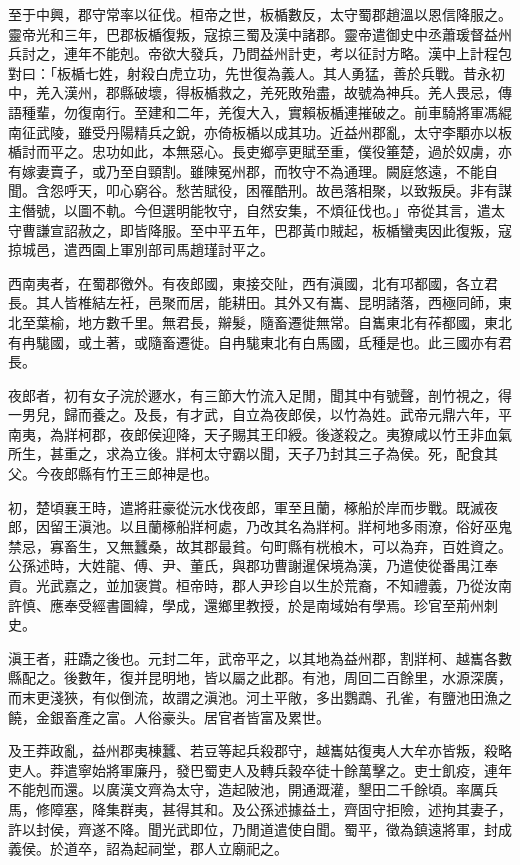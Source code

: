 \begin{pinyinscope}
至于中興，郡守常率以征伐。桓帝之世，板楯數反，太守蜀郡趙溫以恩信降服之。靈帝光和三年，巴郡板楯復叛，寇掠三蜀及漢中諸郡。靈帝遣御史中丞蕭瑗督益州兵討之，連年不能剋。帝欲大發兵，乃問益州計吏，考以征討方略。漢中上計程包對曰：「板楯七姓，射殺白虎立功，先世復為義人。其人勇猛，善於兵戰。昔永初中，羌入漢州，郡縣破壞，得板楯救之，羌死敗殆盡，故號為神兵。羌人畏忌，傳語種輩，勿復南行。至建和二年，羌復大入，實賴板楯連摧破之。前車騎將軍馮緄南征武陵，雖受丹陽精兵之銳，亦倚板楯以成其功。近益州郡亂，太守李顒亦以板楯討而平之。忠功如此，本無惡心。長吏鄉亭更賦至重，僕役箠楚，過於奴虜，亦有嫁妻賣子，或乃至自頸割。雖陳冤州郡，而牧守不為通理。闕庭悠遠，不能自聞。含怨呼天，叩心窮谷。愁苦賦役，困罹酷刑。故邑落相聚，以致叛戾。非有謀主僭號，以圖不軌。今但選明能牧守，自然安集，不煩征伐也。」帝從其言，遣太守曹謙宣詔赦之，即皆降服。至中平五年，巴郡黃巾賊起，板楯蠻夷因此復叛，寇掠城邑，遣西園上軍別部司馬趙瑾討平之。

西南夷者，在蜀郡徼外。有夜郎國，東接交阯，西有滇國，北有邛都國，各立君長。其人皆椎結左衽，邑聚而居，能耕田。其外又有巂、昆明諸落，西極同師，東北至葉榆，地方數千里。無君長，辮髮，隨畜遷徙無常。自巂東北有莋都國，東北有冉駹國，或土著，或隨畜遷徙。自冉駹東北有白馬國，氐種是也。此三國亦有君長。

夜郎者，初有女子浣於遯水，有三節大竹流入足閒，聞其中有號聲，剖竹視之，得一男兒，歸而養之。及長，有才武，自立為夜郎侯，以竹為姓。武帝元鼎六年，平南夷，為牂柯郡，夜郎侯迎降，天子賜其王印綬。後遂殺之。夷獠咸以竹王非血氣所生，甚重之，求為立後。牂柯太守霸以聞，天子乃封其三子為侯。死，配食其父。今夜郎縣有竹王三郎神是也。

初，楚頃襄王時，遣將莊豪從沅水伐夜郎，軍至且蘭，椓船於岸而步戰。既滅夜郎，因留王滇池。以且蘭椓船牂柯處，乃改其名為牂柯。牂柯地多雨潦，俗好巫鬼禁忌，寡畜生，又無蠶桑，故其郡最貧。句町縣有桄桹木，可以為弃，百姓資之。公孫述時，大姓龍、傅、尹、董氏，與郡功曹謝暹保境為漢，乃遣使從番禺江奉貢。光武嘉之，並加褒賞。桓帝時，郡人尹珍自以生於荒裔，不知禮義，乃從汝南許慎、應奉受經書圖緯，學成，還鄉里教授，於是南域始有學焉。珍官至荊州刺史。

滇王者，莊蹻之後也。元封二年，武帝平之，以其地為益州郡，割牂柯、越巂各數縣配之。後數年，復并昆明地，皆以屬之此郡。有池，周回二百餘里，水源深廣，而末更淺狹，有似倒流，故謂之滇池。河土平敞，多出鸚鵡、孔雀，有鹽池田漁之饒，金銀畜產之富。人俗豪头。居官者皆富及累世。

及王莽政亂，益州郡夷棟蠶、若豆等起兵殺郡守，越巂姑復夷人大牟亦皆叛，殺略吏人。莽遣寧始將軍廉丹，發巴蜀吏人及轉兵穀卒徒十餘萬擊之。吏士飢疫，連年不能剋而還。以廣漢文齊為太守，造起陂池，開通溉灌，墾田二千餘頃。率厲兵馬，修障塞，降集群夷，甚得其和。及公孫述據益土，齊固守拒險，述拘其妻子，許以封侯，齊遂不降。聞光武即位，乃閒道遣使自聞。蜀平，徵為鎮遠將軍，封成義侯。於道卒，詔為起祠堂，郡人立廟祀之。


\end{pinyinscope}
